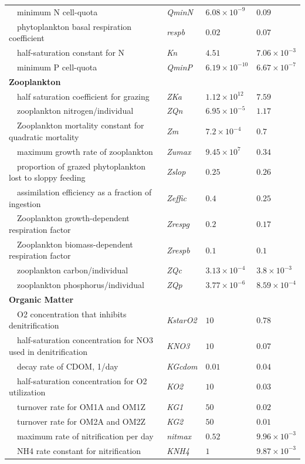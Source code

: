 \documentclass[review]{elsarticle}\usepackage[]{graphicx}\usepackage[]{color}
\begin{document}
\begin{table}[!tbp]
{\begin{center}
\begin{tabular}{llll}
~~minimum N cell-quota&\textit{QminN}&$6.08\times 10^{-9}$&$0.09$\tabularnewline
~~phytoplankton basal respiration coefficient&\textit{respb}&$0.02$&$0.07$\tabularnewline
~~half-saturation constant for N&\textit{Kn}&$4.51$&$7.06\times 10^{-3}$\tabularnewline
~~minimum P cell-quota&\textit{QminP}&$6.19\times 10^{-10}$&$6.67\times 10^{-7}$\tabularnewline
\hline
{\bfseries Zooplankton}&&&\tabularnewline
~~half saturation coefficient for grazing&\textit{ZKa}&$1.12\times 10^{12}$&$7.59$\tabularnewline
~~zooplankton nitrogen/individual&\textit{ZQn}&$6.95\times 10^{-5}$&$1.17$\tabularnewline
~~Zooplankton mortality constant for quadratic mortality&\textit{Zm}&$7.2\times 10^{-4}$&$0.7$\tabularnewline
~~maximum growth rate of zooplankton&\textit{Zumax}&$9.45\times 10^{7}$&$0.34$\tabularnewline
~~proportion of grazed phytoplankton lost to sloppy feeding&\textit{Zslop}&$0.25$&$0.26$\tabularnewline
~~assimilation efficiency as a fraction of ingestion&\textit{Zeffic}&$0.4$&$0.25$\tabularnewline
~~Zooplankton growth-dependent respiration factor&\textit{Zrespg}&$0.2$&$0.17$\tabularnewline
~~Zooplankton biomass-dependent respiration factor&\textit{Zrespb}&$0.1$&$0.1$\tabularnewline
~~zooplankton carbon/individual&\textit{ZQc}&$3.13\times 10^{-4}$&$3.8\times 10^{-3}$\tabularnewline
~~zooplankton phosphorus/individual&\textit{ZQp}&$3.77\times 10^{-6}$&$8.59\times 10^{-4}$\tabularnewline
\hline
{\bfseries Organic Matter}&&&\tabularnewline
~~O2 concentration that inhibits denitrification&\textit{KstarO2}&$10$&$0.78$\tabularnewline
~~half-saturation concentration for NO3 used in denitrification&\textit{KNO3}&$10$&$0.07$\tabularnewline
~~decay rate of CDOM, 1/day&\textit{KGcdom}&$0.01$&$0.04$\tabularnewline
~~half-saturation concentration for O2 utilization&\textit{KO2}&$10$&$0.03$\tabularnewline
~~turnover rate for OM1A and OM1Z&\textit{KG1}&$50$&$0.02$\tabularnewline
~~turnover rate for OM2A and OM2Z&\textit{KG2}&$50$&$0.01$\tabularnewline
~~maximum rate of nitrification per day&\textit{nitmax}&$0.52$&$9.96\times 10^{-3}$\tabularnewline
~~NH4 rate constant for nitrification&\textit{KNH4}&$1$&$9.87\times 10^{-3}$\tabularnewline
\hline
\end{tabular}\end{center}}
\end{table}
\end{document}
